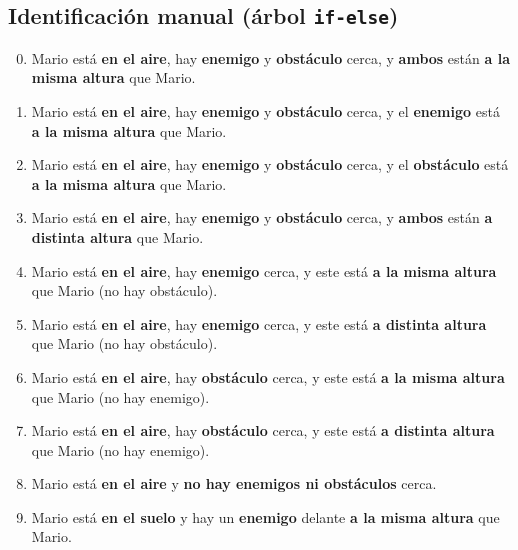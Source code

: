 \documentclass[10pt, spanish, pdftex]{../.template/template}
\begin{document}
    \subsection{Identificación manual (árbol \texttt{if-else})}\label{ifelse}
        \begin{enumerate}
            \setcounter{enumi}{-1}
                \item Mario está \textbf{en el aire}, hay \textbf{enemigo} y \textbf{obstáculo} cerca, y \textbf{ambos} están \textbf{a la misma altura} que Mario.
                \item Mario está \textbf{en el aire}, hay \textbf{enemigo} y \textbf{obstáculo} cerca, y el \textbf{enemigo} está \textbf{a la misma altura} que Mario.
                \item Mario está \textbf{en el aire}, hay \textbf{enemigo} y \textbf{obstáculo} cerca, y el \textbf{obstáculo} está \textbf{a la misma altura} que Mario.
                \item Mario está \textbf{en el aire}, hay \textbf{enemigo} y \textbf{obstáculo} cerca, y \textbf{ambos} están \textbf{a distinta altura} que Mario.
                \item Mario está \textbf{en el aire}, hay \textbf{enemigo} cerca, y este está \textbf{a la misma altura} que Mario (no hay obstáculo).
                \item Mario está \textbf{en el aire}, hay \textbf{enemigo} cerca, y este está \textbf{a distinta altura} que Mario (no hay obstáculo).
                \item Mario está \textbf{en el aire}, hay \textbf{obstáculo} cerca, y este está \textbf{a la misma altura} que Mario (no hay enemigo).
                \item Mario está \textbf{en el aire}, hay \textbf{obstáculo} cerca, y este está \textbf{a distinta altura} que Mario (no hay enemigo).
                \item Mario está \textbf{en el aire} y \textbf{no hay enemigos ni obstáculos} cerca.
                \item Mario está \textbf{en el suelo} y hay un \textbf{enemigo} delante \textbf{a la misma altura} que Mario.

\end{enumerate}
\end{document}
